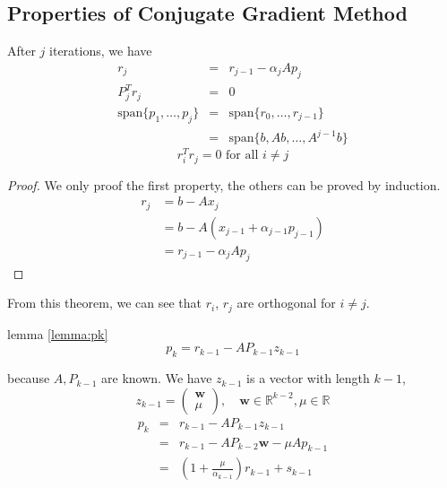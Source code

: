 \subsection{Properties of Conjugate Gradient Method}

\begin{theorem}
    After $j$ iterations, we have 
    \begin{eqnarray}
        r_j & = & r_{j-1} - \alpha_j Ap_j \nonumber \\
        P_j^T r_j &= & 0 \label{eq:Pr}\\
        \mbox{span}\{p_1, \ldots, p_j\}
        & = & 
        \mbox{span}\{r_0, \ldots, r_{j-1}\} \nonumber \\
        & = & \mbox{span}\{b, Ab, \ldots,
        A^{j-1}b\} \nonumber
    \end{eqnarray}
    \[
        r_i^T r_j = 0 \mbox{ for all } i \neq j
    \]
\end{theorem}
\begin{proof}
    We only proof the first property, the others can be proved by induction. \begin{align*}
        r_j &= b - A x_j \\
        &= b - A(x_{j-1} + \alpha_{j-1} p_{j-1}) \\
        &= r_{j-1} - \alpha_j A p_j
    \end{align*}
\end{proof} 

From this theorem, we can see that $r_i$, $r_j$ are orthogonal for $i \neq j$.

\begin{recall}
    lemma \ref{lemma:pk}
    \[
        p_k = r_{k-1} - A P_{k-1} z_{k-1}
    \]
\end{recall}

 because $A, P_{k-1}$ are known. We have $z_{k-1}$ is a vector with length $k-1$, \[
    z_{k-1} = \begin{pmatrix}
        \mathbf{w} \\ \mu
    \end{pmatrix}, \quad \mathbf{w} \in \mathbb{R}^{k-2}, \mu \in \mathbb{R}
\]
\begin{eqnarray}
    p_k & = & r_{k-1} - AP_{k-1} z_{k-1} \label{eq:rApz}\\
& = &r_{k-1} - AP_{k-2}\mathbf{w} - \mu Ap_{k-1} \nonumber \\
& = & (1 + \frac{\mu}{\alpha_{k-1}}) r_{k-1} + s_{k-1}
\label{eq:pk}
\end{eqnarray}

